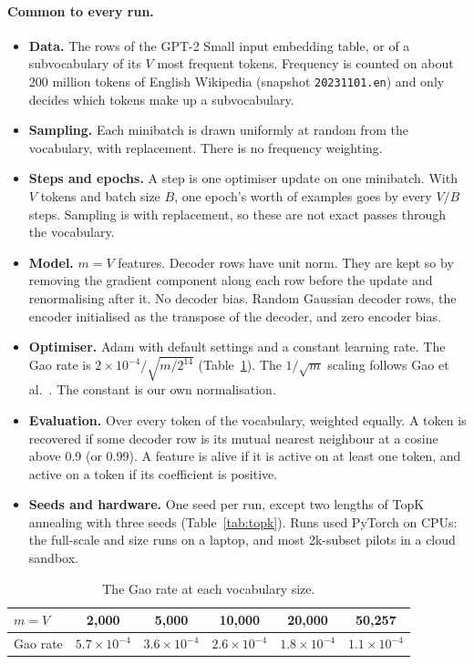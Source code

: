 \documentclass[11pt]{article}
\begin{document}
\paragraph{Common to every run.}
\begin{itemize}[leftmargin=*]
\item \textbf{Data.} The rows of the GPT-2 Small input embedding table, or of a subvocabulary of its $V$ most frequent tokens. Frequency is counted on about 200 million tokens of English Wikipedia (snapshot \texttt{20231101.en}) and only decides which tokens make up a subvocabulary.
\item \textbf{Sampling.} Each minibatch is drawn uniformly at random from the vocabulary, with replacement. There is no frequency weighting.
\item \textbf{Steps and epochs.} A step is one optimiser update on one minibatch. With $V$ tokens and batch size $B$, one epoch's worth of examples goes by every $V/B$ steps. Sampling is with replacement, so these are not exact passes through the vocabulary.
\item \textbf{Model.} $m = V$ features. Decoder rows have unit norm. They are kept so by removing the gradient component along each row before the update and renormalising after it. No decoder bias. Random Gaussian decoder rows, the encoder initialised as the transpose of the decoder, and zero encoder bias.
\item \textbf{Optimiser.} Adam with default settings and a constant learning rate. The Gao rate is $2\times10^{-4}/\sqrt{m/2^{14}}$ (Table~\ref{tab:gao}). The $1/\sqrt{m}$ scaling follows Gao et al.~\cite{gao2024scaling}. The constant is our own normalisation.
\item \textbf{Evaluation.} Over every token of the vocabulary, weighted equally. A token is recovered if some decoder row is its mutual nearest neighbour at a cosine above 0.9 (or 0.99). A feature is alive if it is active on at least one token, and active on a token if its coefficient is positive.
\item \textbf{Seeds and hardware.} One seed per run, except two lengths of TopK annealing with three seeds (Table~\ref{tab:topk}). Runs used PyTorch \cite{paszke2019pytorch} on CPUs: the full-scale and size runs on a laptop, and most 2k-subset pilots in a cloud sandbox.
\end{itemize}

\begin{table}[h]
\centering
\begin{tabular}{lccccc}
\toprule
$m = V$ & 2,000 & 5,000 & 10,000 & 20,000 & 50,257 \\
\midrule
Gao rate & $5.7\times10^{-4}$ & $3.6\times10^{-4}$ & $2.6\times10^{-4}$ & $1.8\times10^{-4}$ & $1.1\times10^{-4}$ \\
\bottomrule
\end{tabular}
\caption{The Gao rate at each vocabulary size.}
\label{tab:gao}
\end{table}
\end{document}
